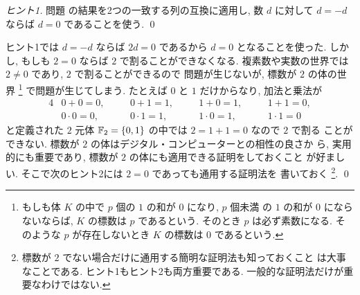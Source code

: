 \documentclass[12pt,twoside]{jarticle}
\begin{document}
\begin{proof}[ヒント1]
  問題  の結果を2つの一致する列の互換に適用し, 
  数 $d$ に対して $d=-d$ ならば $d=0$ であることを使う. 
  \qed
\end{proof}

\begin{guide}
  ヒント1では $d=-d$ ならば $2d=0$ であるから $d=0$ となることを使った.
  しかし, もしも $2=0$ ならば $2$ で割ることができなくなる. 
  複素数や実数の世界では $2\ne 0$ であり, $2$ で割ることができるので
  問題が生じないが, 標数が $2$ の体の世界%
  \footnote{もしも体 $K$ の中で $p$ 個の $1$ の和が $0$ になり, $p$ 個未満
    の $1$ の和が $0$ にならないならば, $K$ の標数は $p$ であるという. 
    そのとき $p$ は必ず素数になる.
    そのような $p$ が存在しないとき $K$ の標数は $0$ であるという.}%
  で問題が生じてしまう. たとえば $0$ と $1$ だけからなり, 加法と乗法が
  \begin{alignat*}{4}
    & 0+0=0, &\quad& 0+1=1, &\quad& 1+0=1, &\quad& 1+1=0, \\
    & 0\cdot0=0, &\quad& 0\cdot1=1, &\quad& 1\cdot0=1, &\quad& 1\cdot1=0 
  \end{alignat*}
  と定義された $2$ 元体 ${\mathbb F}_2=\{0,1\}$ の中では $2=1+1=0$ なので $2$ で割る
  ことができない.  標数が $2$ の体はデジタル・コンピューターとの相性の良さか
  ら, 実用的にも重要であり, 標数が $2$ の体にも適用できる証明をしておくこと
  が好ましい.  そこで次のヒント2には $2=0$ であっても通用する証明法を
  書いておく%
  \footnote{標数が $2$ でない場合だけに通用する簡明な証明法も知っておくこと
    は大事なことである.  ヒント1もヒント2も両方重要である.
    一般的な証明法だけが重要なわけではない.}.
  \qed
\end{guide}
\end{document}
